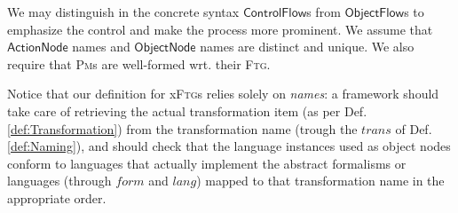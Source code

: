 We may distinguish in the concrete syntax $\mathsf{ControlFlow}$s from 
$\mathsf{ObjectFlow}$s to emphasize the control and make the process more 
prominent. 
We assume that $\mathsf{ActionNode}$ names and $\mathsf{ObjectNode}$ names 
are distinct and unique. We also require that \textsc{Pm}s are well-formed 
wrt. their \textsc{Ftg}.

Notice that our definition for x\textsc{Ftg}s relies solely on \emph{names}: a 
framework should take care of retrieving the actual transformation item (as per 
Def. \ref{def:Transformation}) from the transformation name (trough 
the $trans$ of Def. \ref{def:Naming}), and should check that the language 
instances used as object nodes conform to languages that actually implement the 
abstract formalisms or languages (through $form$ and $lang$) mapped to that 
transformation name in the appropriate 
order.


